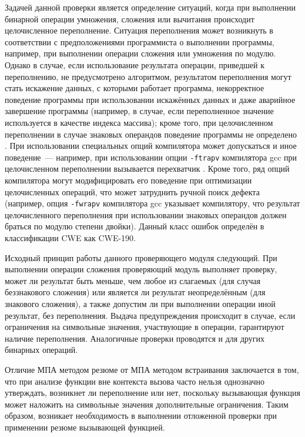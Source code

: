 Задачей данной проверки является определение ситуаций, когда при выполнении бинарной операции умножения, сложения или вычитания происходит целочисленное переполнение. Ситуация переполнения может возникнуть в соответствии с предположениями программиста о выполнении программы, например, при выполнении операции сложения или умножения по модулю. Однако в случае, если использование результата операции, приведшей к переполнению, не предусмотрено алгоритмом, результатом переполнения могут стать искажение данных, с которыми работает программа, некорректное поведение программы при использовании искажённых данных и даже аварийное завершение программы (например, в случае, если переполненное значение используется в качестве индекса массива); кроме того, при целочисленном переполнении в случае знаковых операндов поведение программы не определено \cite{c-std}. При использовании специальных опций компилятора может допускаться и иное поведение~--- например, при использовании опции \texttt{-ftrapv} компилятора gcc при целочисленном переполнении вызывается перехватчик \cite{gcc-man}. Кроме того, ряд опций компилятора могут модифицировать его поведение при оптимизации целочисленных операций, что может затруднить ручной поиск дефекта (например, опция \texttt{-fwrapv} компилятора gcc указывает компилятору, что результат целочисленного переполнения при использовании знаковых операндов должен браться по модулю степени двойки). Данный класс ошибок определён в классификации CWE как CWE-190.

Исходный принцип работы данного проверяющего модуля следующий. При выполнении операции сложения проверяющий модуль выполняет проверку, может ли результат быть меньше, чем любое из слагаемых (для случая беззнакового сложения) или является ли результат неопределённым (для знакового сложения), а также допустим ли при выполнении операции иной результат, без переполнения. Выдача предупреждения происходит в случае, если ограничения на символьные значения, участвующие в операции, гарантируют наличие переполнения. Аналогичные проверки проводятся и для других бинарных операций.

Отличие МПА методом резюме от МПА методом встраивания заключается в том, что при анализе функции вне контекста вызова часто нельзя однозначно утверждать, возникнет ли переполнение или нет, поскольку вызывающая функция может наложить на символьные значения дополнительные ограничения. Таким образом, возникает необходимость в выполнении отложенной проверки при применении резюме вызывающей функцией.

